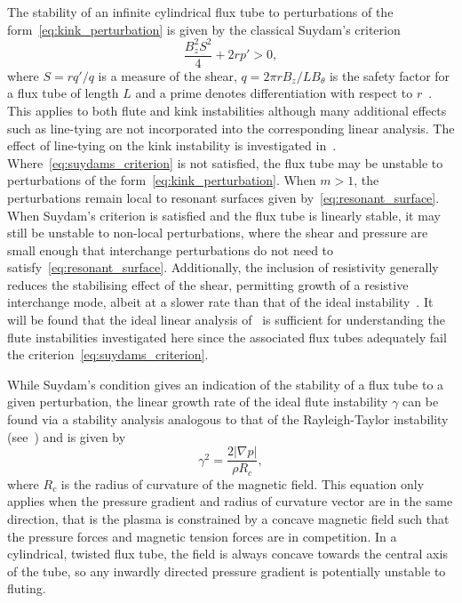 \documentclass[fleqn,usenatbib]{mnras}
\begin{document}
The stability of an infinite cylindrical flux tube to perturbations of
the form~\eqref{eq:kink_perturbation} is given by the classical
Suydam's criterion~\citep{suydamStabilityLinearPinch1958}
\begin{equation}
  \label{eq:suydams_criterion}
\frac{B_z^2 S^2}{4} + 2 r p' > 0,
\end{equation}
where $S = r q'/q$ is a measure of the shear, $q = 2\pi r B_z / L
B_{\theta}$ is the safety factor for a flux tube of length $L$ and a
prime denotes differentiation with respect to
$r$~\citep{mikhailovskiiInstabilitiesConfinedPlasma1998}. This applies
to both flute and kink instabilities although many
additional effects such as line-tying are not incorporated into the
corresponding linear analysis. The effect of line-tying on the kink
instability is investigated
in~\citet{hoodKinkInstabilitySolar1979}. Where~\eqref{eq:suydams_criterion}
is not satisfied, the flux tube may be unstable to perturbations of
the form~\eqref{eq:kink_perturbation}. When $m>1$, the perturbations
remain local to resonant surfaces given
by~\eqref{eq:resonant_surface}. 
When Suydam's criterion is satisfied and the flux tube is linearly stable, it may still be unstable to non-local perturbations, where the shear and pressure are small enough that interchange perturbations do not need to satisfy~\eqref{eq:resonant_surface}. Additionally, the inclusion of resistivity generally reduces the stabilising effect of the shear, permitting growth of a resistive interchange mode, albeit at a slower rate than that of the ideal instability~\citep{mikhailovskiiInstabilitiesConfinedPlasma1998}. It will be found that the ideal linear analysis of~\cite{mikhailovskiiInstabilitiesConfinedPlasma1998} is sufficient for understanding the flute instabilities investigated here since the associated flux tubes adequately fail the criterion~\eqref{eq:suydams_criterion}.

While Suydam's condition gives an indication of the stability of a flux tube to a given perturbation, the linear growth rate of the ideal flute instability $\gamma$ can be found via a stability analysis analogous to that of the Rayleigh-Taylor instability (see~\citep[][]{goldstonIntroductionPlasmaPhysics2020}) and is given by
\begin{equation}
  \label{eq:fluting_growth_rate}
\gamma^2 = \frac{2|\nabla p|}{\rho R_c},
\end{equation}
where $R_c$ is the radius of curvature of the magnetic field. This equation only applies when the pressure gradient and radius of curvature vector are in the same direction, that is the plasma is constrained by a concave magnetic field such that the pressure forces and magnetic tension forces are in competition. In a cylindrical, twisted flux tube, the field is always concave towards the central axis of the tube, so any inwardly directed pressure gradient is potentially unstable to fluting.
\end{document}
